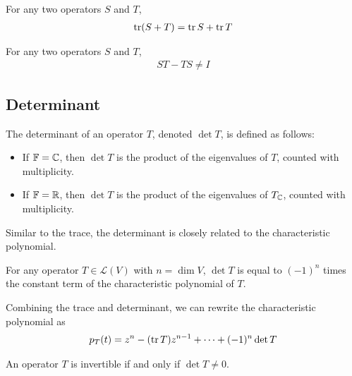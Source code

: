 \documentclass{article}
\begin{document}
\begin{corollary}
  For any two operators $S$ and $T$,
  \begin{align}
    \tr (S + T) = \tr S + \tr T
  \end{align}
\end{corollary}

\begin{theorem}[$ST - TS \neq I$]
  For any two operators $S$ and $T$,
  \begin{align}
    ST - TS \neq I
  \end{align}
\end{theorem}

\subsection{Determinant}

\begin{definition}
  The determinant of an operator $T$, denoted $\det T$, is defined as follows:
  \begin{itemize}
    \item If $\mathbb{F} = \mathbb{C}$, then $\det T$ is the product of the eigenvalues of $T$, counted with multiplicity.
    \item If $\mathbb{F} = \mathbb{R}$, then $\det T$ is the product of the eigenvalues of $T_{\mathbb{C}}$, counted with multiplicity.
  \end{itemize}
\end{definition}

Similar to the trace, the determinant is closely related to the characteristic polynomial.

\begin{theorem}
  For any operator $T \in \mathcal{L}(V)$ with $n = \dim V$, $\det T$ is equal to $(-1)^n$ times the constant term of the characteristic polynomial of $T$.
\end{theorem}

\begin{remark}
  Combining the trace and determinant, we can rewrite the characteristic polynomial as
  \begin{align}
    p_T(t) = z^n - (\tr T)z^{n - 1} + \cdots + (-1)^n \det T
  \end{align}
\end{remark}

\begin{theorem}
  An operator $T$ is invertible if and only if $\det T \neq 0$.
\end{theorem}
\end{document}
